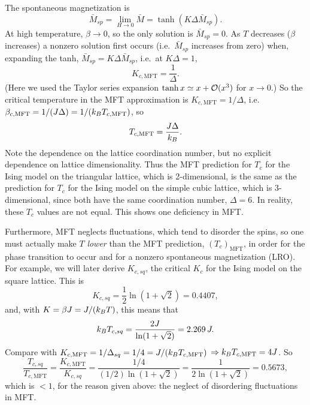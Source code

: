 The spontaneous magnetization is
\begin{equation}
  \bar M_{sp} = \lim_{H\to 0}\bar M = \tanh(K\Delta\bar M_{sp}).
\end{equation}
At high temperature, $\beta\to 0$, so the only solution is $\bar M_{sp} = 0$. As $T$ decreases
($\beta$ increases) a nonzero solution first occurs (i.e.\ $\bar M_{sp}$ increases from zero) when,
expanding the tanh, $\bar M_{sp} = K\Delta\bar M_{sp}$, i.e.\ at $K\Delta = 1$,
\begin{equation}
  K_{c,\text{MFT}} = \frac{1}{\Delta}.
\end{equation}
(Here we used the Taylor series expansion $\tanh x\simeq x + \mathcal{O}(x^3)$ for $x\to 0$.) So the
critical temperature in the MFT approximation is $K_{c,\text{MFT}} = 1/\Delta$, i.e.\
$\beta_{c,\text{MFT}} = 1/(J\Delta) = 1/(k_{B} T_{c,\text{MFT}})$, so
\begin{equation}
  T_{c,\text{MFT}} = \frac{J\Delta}{k_{B}}.
\end{equation}
Note the dependence on the lattice coordination number, but no explicit dependence on lattice
dimensionality. Thus the MFT prediction for $T_c$ for the Ising model on the triangular lattice,
which is 2-dimensional, is the same as the prediction for $T_c$ for the Ising model on the simple
cubic lattice, which is 3-dimensional, since both have the same coordination number, $\Delta = 6$.
In reality, these $T_c$ values are not equal. This shows one deficiency in MFT.

Furthermore, MFT neglects fluctuations, which tend to disorder the spins, so one must actually make
$T$ \emph{lower} than the MFT prediction, $(T_c)_{\text{MFT}}$, in order for the phase transition to
occur and for a nonzero spontaneous magnetization (LRO). For example, we will later derive
$K_{c,sq}$, the critical $K_c$ for the Ising model on the square lattice. This is
\begin{equation}
  K_{c,sq} = \frac{1}{2}\ln(1+\sqrt2) = 0.4407,
\end{equation}
and, with $K = \beta J = J/(k_{B} T)$, this means that
\begin{equation}
  k_{B} T_{c,sq} = \frac{2J}{\ln(1+\sqrt2)} = 2.269\,J .
\end{equation}
Compare with $K_{c,\text{MFT}} = 1/\Delta_{sq} = 1/4 = J/(k_{B} T_{c,\text{MFT}})$
$\Rightarrow k_{B} T_{c,\text{MFT}} = 4J$. So
\begin{equation}
  \frac{T_{c,sq}}{T_{c,\text{MFT}}} = \frac{K_{c,\text{MFT}}}{K_{c,sq}}
  = \frac{1/4}{(1/2)\ln(1+\sqrt2)} = \frac{1}{2\ln(1+\sqrt2)} = 0.5673,
\end{equation}
which is $<1$, for the reason given above: the neglect of disordering fluctuations in MFT.

